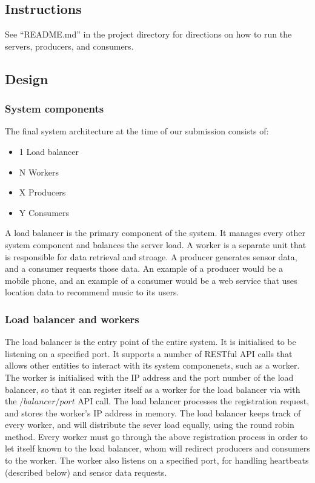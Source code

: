 \documentclass{sigchi}
\begin{document}
\subsection{Instructions}

See \enquote{README.md} in the project directory for directions on how to run the servers, producers, and consumers.

\subsection{Design}

\subsubsection{System components}

The final system architecture at the time of our submission consists of:

\begin{itemize}
  \item 1 Load balancer
  \item N Workers
  \item X Producers
  \item Y Consumers
\end{itemize}

A load balancer is the primary component of the system. It manages every other system component and balances the server load. A worker is a separate unit that is responsible for data retrieval and stroage. A producer generates sensor data, and a consumer requests those data. An example of a producer would be a mobile phone, and an example of a consumer would be a web service that uses location data to recommend music to its users.

\subsubsection{Load balancer and workers}

The load balancer is the entry point of the entire system. It is initialised to be listening on a specified port. It supports a number of RESTful API calls that allows other entities to interact with its system componenets, such as a worker. The worker is initialised with the IP address and the port number of the load balancer, so that it can register itself as a worker for the load balancer via with the $/balancer/port$ API call. The load balancer processes the registration request, and stores the worker's IP address in memory. The load balancer keeps track of every worker, and will distribute the sever load equally, using the round robin method. Every worker must go through the above registration process in order to let itself known to the load balancer, whom will redirect producers and consumers to the worker. The worker also listens on a specified port, for handling heartbeats (described below) and sensor data requests.
\end{document}
